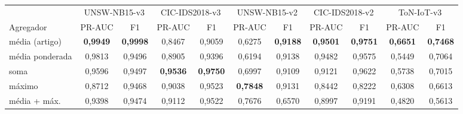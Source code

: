 \begin{tabular}{lcccccccccc}
\toprule
& \multicolumn{2}{c}{UNSW-NB15-v3} & \multicolumn{2}{c}{CIC-IDS2018-v3} & \multicolumn{2}{c}{UNSW-NB15-v2} & \multicolumn{2}{c}{CIC-IDS2018-v2} & \multicolumn{2}{c}{ToN-IoT-v3} \\
\cmidrule(lr){2-3}\cmidrule(lr){4-5}\cmidrule(lr){6-7}\cmidrule(lr){8-9}\cmidrule(lr){10-11}
Agregador & PR-AUC & F1 & PR-AUC & F1 & PR-AUC & F1 & PR-AUC & F1 & PR-AUC & F1 \\
\midrule
média (artigo) & \textbf{0,9949} & \textbf{0,9998} & 0,8467 & 0,9059 & 0,6275 & \textbf{0,9188} & \textbf{0,9501} & \textbf{0,9751} & \textbf{0,6651} & \textbf{0,7468} \\
média ponderada & 0,9813 & 0,9496 & 0,8905 & 0,9396 & 0,6194 & 0,9138 & 0,9482 & 0,9575 & 0,5449 & 0,7064 \\
soma & 0,9596 & 0,9497 & \textbf{0,9536} & \textbf{0,9750} & 0,6997 & 0,9109 & 0,9121 & 0,9622 & 0,5738 & 0,7015 \\
máximo & 0,8712 & 0,9468 & 0,9038 & 0,9523 & \textbf{0,7848} & 0,9131 & 0,8442 & 0,8222 & 0,6308 & 0,6613 \\
média + máx. & 0,9398 & 0,9474 & 0,9112 & 0,9522 & 0,7676 & 0,6570 & 0,8997 & 0,9191 & 0,4820 & 0,5613 \\
\bottomrule
\end{tabular}
